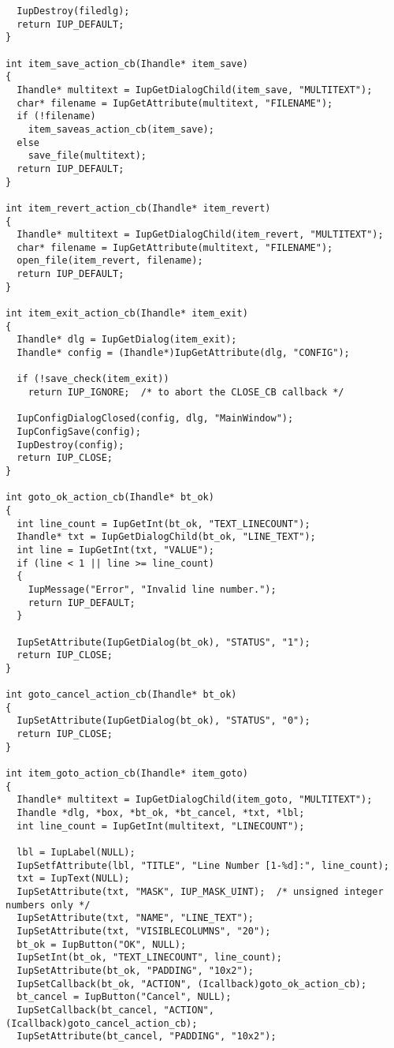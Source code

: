 \documentclass{ctexart}
\begin{document}
\begin{lstlisting}
  IupDestroy(filedlg);
  return IUP_DEFAULT;
}

int item_save_action_cb(Ihandle* item_save)
{
  Ihandle* multitext = IupGetDialogChild(item_save, "MULTITEXT");
  char* filename = IupGetAttribute(multitext, "FILENAME");
  if (!filename)
    item_saveas_action_cb(item_save);
  else
    save_file(multitext);
  return IUP_DEFAULT;
}

int item_revert_action_cb(Ihandle* item_revert)
{
  Ihandle* multitext = IupGetDialogChild(item_revert, "MULTITEXT");
  char* filename = IupGetAttribute(multitext, "FILENAME");
  open_file(item_revert, filename);
  return IUP_DEFAULT;
}

int item_exit_action_cb(Ihandle* item_exit)
{
  Ihandle* dlg = IupGetDialog(item_exit);
  Ihandle* config = (Ihandle*)IupGetAttribute(dlg, "CONFIG");

  if (!save_check(item_exit))
    return IUP_IGNORE;  /* to abort the CLOSE_CB callback */

  IupConfigDialogClosed(config, dlg, "MainWindow");
  IupConfigSave(config);
  IupDestroy(config);
  return IUP_CLOSE;
}

int goto_ok_action_cb(Ihandle* bt_ok)
{
  int line_count = IupGetInt(bt_ok, "TEXT_LINECOUNT");
  Ihandle* txt = IupGetDialogChild(bt_ok, "LINE_TEXT");
  int line = IupGetInt(txt, "VALUE");
  if (line < 1 || line >= line_count)
  {
    IupMessage("Error", "Invalid line number.");
    return IUP_DEFAULT;
  }

  IupSetAttribute(IupGetDialog(bt_ok), "STATUS", "1");
  return IUP_CLOSE;
}

int goto_cancel_action_cb(Ihandle* bt_ok)
{
  IupSetAttribute(IupGetDialog(bt_ok), "STATUS", "0");
  return IUP_CLOSE;
}

int item_goto_action_cb(Ihandle* item_goto)
{
  Ihandle* multitext = IupGetDialogChild(item_goto, "MULTITEXT");
  Ihandle *dlg, *box, *bt_ok, *bt_cancel, *txt, *lbl;
  int line_count = IupGetInt(multitext, "LINECOUNT");

  lbl = IupLabel(NULL);
  IupSetfAttribute(lbl, "TITLE", "Line Number [1-%d]:", line_count);
  txt = IupText(NULL);
  IupSetAttribute(txt, "MASK", IUP_MASK_UINT);  /* unsigned integer numbers only */
  IupSetAttribute(txt, "NAME", "LINE_TEXT");
  IupSetAttribute(txt, "VISIBLECOLUMNS", "20");
  bt_ok = IupButton("OK", NULL);
  IupSetInt(bt_ok, "TEXT_LINECOUNT", line_count);
  IupSetAttribute(bt_ok, "PADDING", "10x2");
  IupSetCallback(bt_ok, "ACTION", (Icallback)goto_ok_action_cb);
  bt_cancel = IupButton("Cancel", NULL);
  IupSetCallback(bt_cancel, "ACTION", (Icallback)goto_cancel_action_cb);
  IupSetAttribute(bt_cancel, "PADDING", "10x2");


\end{lstlisting}
\end{document}
